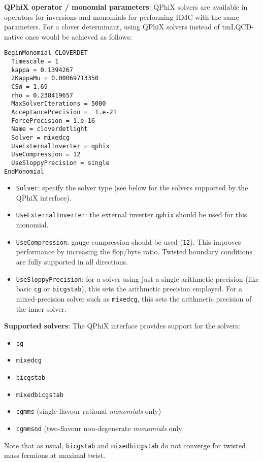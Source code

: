 \noindent\textbf{QPhiX operator / monomial parameters}: QPhiX solvers are available in operators for inversions and monomials for performing HMC with the same parameters.
For a clover determinant, using QPhiX solvers instead of tmLQCD-native ones would be achieved as follows:
\begin{framed}
\begin{Verbatim}
BeginMonomial CLOVERDET
  Timescale = 1
  kappa = 0.1394267
  2KappaMu = 0.00069713350
  CSW = 1.69
  rho = 0.238419657
  MaxSolverIterations = 5000
  AcceptancePrecision =  1.e-21
  ForcePrecision = 1.e-16
  Name = cloverdetlight
  Solver = mixedcg
  UseExternalInverter = qphix
  UseCompression = 12
  UseSloppyPrecision = single
EndMonomial  
\end{Verbatim}
\end{framed}
\begin{itemize}
  \item{\texttt{Solver}: specify the solver type (see below for the solvers supported by the QPhiX interface).} 
  \item{\texttt{UseExternalInverter}: the external inverter \texttt{qphix} should be used for this monomial.}
  \item{\texttt{UseCompression}: gauge compression should be used (\texttt{12}). This improves performance by increasing the flop/byte ratio. Twisted boundary conditions are fully supported in all directions.}
  \item{\texttt{UseSloppyPrecision}: for a solver using just a single arithmetic precision (like basic \texttt{cg} or \texttt{bicgstab}), this sets the arithmetic precision employed. For a mixed-precision solver such as \texttt{mixedcg}, this sets the arithmetic precision of the inner solver.}
\end{itemize}

\noindent\textbf{Supported solvers}: The QPhiX interface provides support for the solvers:
\begin{itemize}
\item{\texttt{cg}}
\item{\texttt{mixedcg}}
\item{\texttt{bicgstab}}
\item{\texttt{mixedbicgstab}}
\item{\texttt{cgmms} (single-flavour rational \emph{monomials} only)}
\item{\texttt{cgmmsnd} (two-flavour non-degenerate \emph{monomials} only}
\end{itemize}
Note that as usual, \texttt{bicgstab} and \texttt{mixedbicgstab} do not converge for twisted mass fermions at maximal twist.
